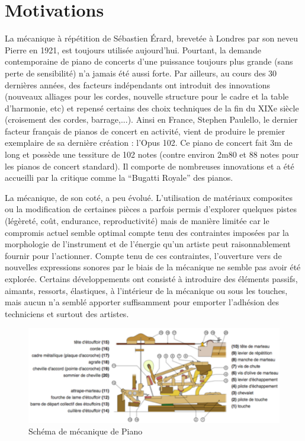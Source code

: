 \documentclass[french,a4paper,12pt]{report}
\begin{document}
 \section{Motivations}
 
 La mécanique à répétition de Sébastien Érard, brevetée à Londres par son neveu Pierre en 1921, est toujours utilisée aujourd’hui. Pourtant, la demande contemporaine de piano de concerts d’une puissance toujours plus grande (sans perte de sensibilité) n’a jamais été aussi forte. Par ailleurs, au cours des 30 dernières années, des facteurs indépendants ont introduit des innovations (nouveaux alliages pour les cordes, nouvelle structure pour le cadre et la table d’harmonie, etc) et repensé certains des choix techniques de la fin du XIXe siècle (croisement des cordes, barrage,...). Ainsi en France, Stephen Paulello, le dernier facteur français de pianos de concert en activité, vient de produire le premier exemplaire de sa dernière création : l’Opus 102. Ce piano de concert fait 3m de long et possède une tessiture de 102 notes (contre environ 2m80 et 88 notes pour les pianos de concert standard). Il comporte de nombreuses innovations et a été accueilli par la critique comme la “Bugatti Royale” des pianos.

La mécanique, de son coté, a peu évolué. L’utilisation de matériaux composites ou la modification de certaines pièces a parfois permis d’explorer quelques pistes (légèreté, coût, endurance, reproductivité) mais de manière limitée car le compromis actuel semble optimal compte tenu des contraintes imposées par la morphologie de l’instrument et de l’énergie qu’un artiste peut raisonnablement fournir pour l’actionner. Compte tenu de ces contraintes, l’ouverture vers de nouvelles expressions sonores par le biais de la mécanique ne semble pas
avoir été explorée. Certains développements ont consisté à introduire des éléments passifs, aimants, ressorts, élastiques, à l’intérieur de la mécanique ou sous les touches, mais aucun n’a semblé apporter suffisamment pour emporter l’adhésion des techniciens et surtout des artistes.\newline

	\begin{figure}[!ht]
    \center
    \includegraphics[width=15cm]{MECA_PIANO.png}
    \caption{Schéma de mécanique de Piano}
		\end{figure} 
\end{document}

